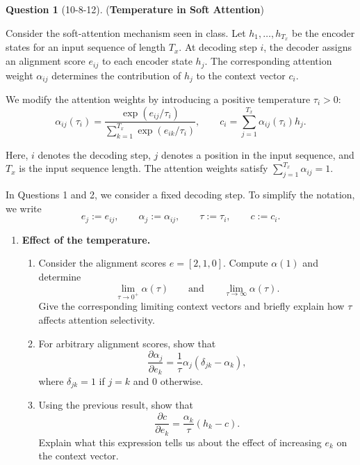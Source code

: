 \documentclass[12pt]{article}
\newif\ifexercise
\theoremstyle{definition}
\newtheorem{exercise}{Question}%
\newcommand{\Exercise}[1]{
\ifexercise#1\fi
}
\newif\ifexercise
\begin{document}
\begin{exercise}[10-8-12] (\textbf{Temperature in Soft Attention})
\Exercise{\label{ex:temperature-attention}}

Consider the soft-attention mechanism seen in class. Let
$h_1,\ldots,h_{T_x}$ be the encoder states for an input sequence of length
$T_x$. At decoding step $i$, the decoder assigns an alignment score $e_{ij}$
to each encoder state $h_j$. The corresponding attention weight
$\alpha_{ij}$ determines the contribution of $h_j$ to the context vector
$c_i$.

We modify the attention weights by introducing a positive temperature
$\tau_i>0$:
\[
\alpha_{ij}(\tau_i)
=
\frac{\exp(e_{ij}/\tau_i)}
{\sum_{k=1}^{T_x}\exp(e_{ik}/\tau_i)},
\qquad
c_i
=
\sum_{j=1}^{T_x}\alpha_{ij}(\tau_i)h_j.
\]

Here, $i$ denotes the decoding step, $j$ denotes a position in the input
sequence, and $T_x$ is the input sequence length. The attention weights
satisfy $\sum_{j=1}^{T_x}\alpha_{ij}=1$.

In Questions 1 and 2, we consider a fixed decoding step. To simplify the
notation, we write
\[
e_j := e_{ij},
\qquad
\alpha_j := \alpha_{ij},
\qquad
\tau := \tau_i,
\qquad
c := c_i.
\]

\begin{enumerate}

    \item \textbf{Effect of the temperature.}

    \begin{enumerate}[label=(\alph*)]
        \item Consider the alignment scores $e=[2,1,0]$. Compute
        $\alpha(1)$ and determine
        \[
        \lim_{\tau\rightarrow0^+}\alpha(\tau)
        \qquad\text{and}\qquad
        \lim_{\tau\rightarrow\infty}\alpha(\tau).
        \]
        Give the corresponding limiting context vectors and briefly explain
        how $\tau$ affects attention selectivity.

        \item For arbitrary alignment scores, show that
        \[
        \frac{\partial\alpha_j}{\partial e_k}
        =
        \frac{1}{\tau}\alpha_j
        \left(\delta_{jk}-\alpha_k\right),
        \]
        where $\delta_{jk}=1$ if $j=k$ and $0$ otherwise.

        \item Using the previous result, show that
        \[
        \frac{\partial c}{\partial e_k}
        =
        \frac{\alpha_k}{\tau}(h_k-c).
        \]
        Explain what this expression tells us about the effect of increasing
        $e_k$ on the context vector.
    \end{enumerate}


\end{enumerate}
\end{exercise}
\end{document}
